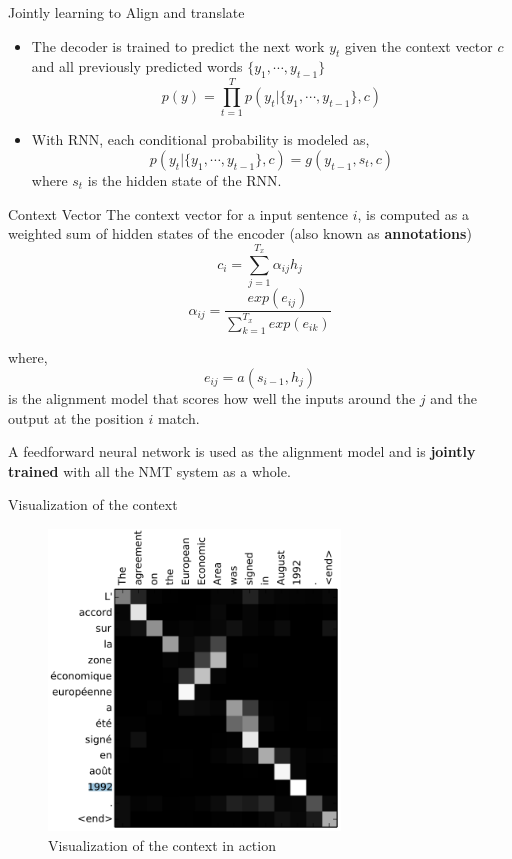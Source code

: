﻿\documentclass[table,aspectratio=43,mathserif,xcolor={usenames,dvipsnames,svgnames,table},10pt]{beamer}
\begin{document}
\begin{frame}{Jointly learning to Align and translate}
\begin{itemize}
 \item The decoder is trained to predict the next work $y_t$ given the context vector $c$ and all previously predicted words $\{ y_1, \cdots, y_{t-1}\}$
 $$ p(y) = \prod^{T}_{t=1} p(y_t | \{ y_1, \cdots, y_{t-1}\} ,c ) $$
 \item With RNN, each conditional probability is modeled as,
 $$ p(y_t | \{ y_1, \cdots, y_{t-1}\}, c) = g(y_{t-1}, s_t, c) $$ where $s_t$ is the hidden state of the RNN.
 \end{itemize}

\end{frame}


\begin{frame}{Context Vector}
  The context vector for a input sentence $i$, is computed as a weighted sum of hidden states of the encoder (also known as \textbf{annotations})
  $$ c_i = \sum_{j=1}^{T_{x}} \alpha_{ij} h_j$$
  $$ \alpha_{ij} = \frac{ exp(e_{ij})}{ \sum_{k=1}^{T_x} exp (e_{ik})}$$

where,
$$ e_{ij} = a(s_{i-1}, h_j)  $$ is the alignment model that scores how well the inputs around the $j$ and the output at the position $i$ match.

A feedforward neural network is used as the alignment model and is \textbf{jointly trained} with all the NMT system as a whole.
\end{frame}

\begin{frame}{Visualization of the context}
 \begin{figure}[h]
    \includegraphics[height=8cm]{images/contextres.png}  
    \caption{Visualization of the context in action}
  \end{figure}
\end{frame}
\end{document}
